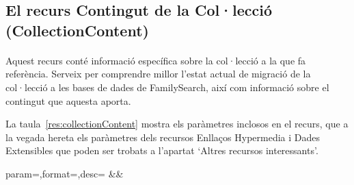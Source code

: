 \subsection{El recurs Contingut de la Col·lecció (CollectionContent)}

    \paragraph{}
    Aquest recurs conté informació específica sobre la col·lecció a la que fa referència. Serveix per  comprendre millor l'estat actual de migració de la col·lecció a les bases de dades de FamilySearch, així com informació sobre el contingut que aquesta aporta.

    La taula~\ref{res:collectionContent} mostra els paràmetres inclosos en el recurs, que a la vegada hereta els paràmetres dels recursos Enllaços Hypermedia i Dades Extensibles que poden ser trobats a l'apartat `Altres recursos interessants'.

    \begin{center}
             {param=\param,format=\format,desc=\desc}
             {\param&\format&\desc}
     \end{center}
